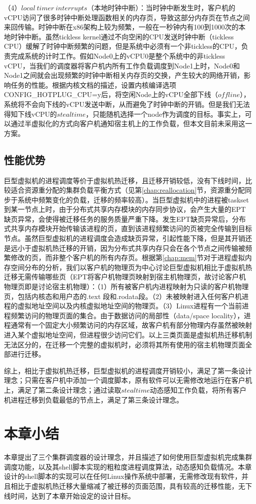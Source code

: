 （4）$local\ timer\ interrupts$（本地时钟中断）：当时钟中断发生时，客户机的vCPU访问了很多时钟中断处理函数相关的内存页，导致这部分内存页在节点之间来回传输。时钟中断在x86架构上较为频繁，一般在一秒钟内有100到1000次的本地时钟中断。虽然tickless kernel通过不向空闲的CPU发送时钟中断（tickless CPU）缓解了时钟中断频繁的问题，但是系统中必须有一个非tickless的CPU，负责完成系统的计时工作。假如Node0上的vCPU0是整个系统中的非tickless vCPU，当我们的调度器将客户机内所有工作负载调度到Node1上时，Node0和Node1之间就会出现频繁的时钟中断相关内存页的交换，产生较大的网络开销，影响任务的性能。根据内核文档的描述，设置内核编译选项CONFIG\_HOTPLUG\_CPU=y后，将空闲Node上的vCPU全部下线（$offline$），系统将不会向下线的vCPU发送中断，从而避免了时钟中断的开销。但是我们无法得知下线vCPU的$steal time$，只能随机选择一个node作为调度的目标。事实上，可以通过半虚拟化的方式向客户机通知宿主机上的工作负载，但本文目前未采用这一方案。

\subsection{性能优势}
巨型虚拟机的进程调度等价于虚拟机热迁移，且迁移开销较低，没有下线时间，比较适合资源重分配的集群负载平衡方式（见第\ref{chap:reallocation}节，资源重分配同步于系统中频繁变化的负载，迁移的频率较高）。当巨型虚拟机中的进程被taskset到某一节点上时，由于分布式共享内存模块的内存同步协议，会产生大量的EPT缺页异常，会使得被迁移任务的服务质量严重下降。发生EPT缺页异常后，分布式共享内存模块开始传输该进程的页，直到该进程频繁访问的页被完全传输到目标节点。虽然巨型虚拟机的进程调度会造成缺页异常，引起性能下降，但是其开销还是远小于虚拟机热迁移的开销，因为分布式共享内存只会在各个节点之间传输被频繁修改的页，而非整个客户机的所有内存页。根据第\ref{chap:mem}节对于进程虚拟内存空间分布的分析，我们以客户机的物理页为中心讨论巨型虚拟机相比于虚拟机热迁移无需传输哪些页（EPT将客户机物理页映射到宿主机物理页，故讨论客户机物理页即是讨论宿主机物理）：（1）所有被客户机内进程映射为只读的客户机物理页，包括内核态和用户态的.text 段和.rodata段。（2）未被映射进入任何客户机进程的虚拟地址空间以及内核虚拟地址空间的物理页。（3）Linux进程有一个当前进程频繁访问的物理页面的集合。由于数据访问的局部性（data/space locality），进程通常有一个固定大小频繁访问的内存区域，故客户机有部分物理内存虽然被映射进入某个虚拟地址空间，但进程很少访问它们。以上三类页面是虚拟机热迁移机制无法区分的，在迁移一个完整的虚拟机时，必须将其所有使用的宿主机物理页面全部进行迁移。

综上，相比于虚拟机热迁移，巨型虚拟机的进程调度开销较小，满足了第一条设计理念；只需在客户机中添加一个调度脚本，原有软件可以无需修改地运行在客户机上，满足了第二条设计理念；通过读取$steal time$动态感知工作负载，将所有客户机进程迁移到负载最低的节点上，满足了第三条设计理念。

\section{本章小结}
本章提出了三个集群调度器的设计理念，并且描述了如何使用巨型虚拟机完成集群调度功能，以及其shell脚本实现的粗粒度进程调度算法，动态感知负载情况。本章设计的shell脚本的实现可以在任何Linux操作系统中部署，无需修改现有软件，并且相比于虚拟机热迁移大量缩减了被迁移的页面范围，具有较高的迁移性能，无下线时间，达到了本章开始设定的设计目标。